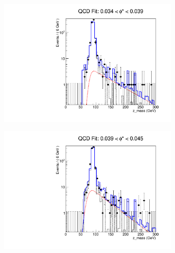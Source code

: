 \begin{figure}[!htbp]
    \centering
    \begin{subfigure}[b]{0.5\textwidth}
        \includegraphics[width=\linewidth]{figures/qcd_fits/qcd_fit_plot_for_09.pdf}
        \caption{}
        \label{fig:qcd_fit_09}
    \end{subfigure}%
    \begin{subfigure}[b]{0.5\textwidth}
        \includegraphics[width=\linewidth]{figures/qcd_fits/qcd_fit_plot_for_10.pdf}
        \caption{}
        \label{fig:qcd_fit_10}
    \end{subfigure}
    \begin{subfigure}[b]{0.5\textwidth}

\end{subfigure}
\end{figure}
